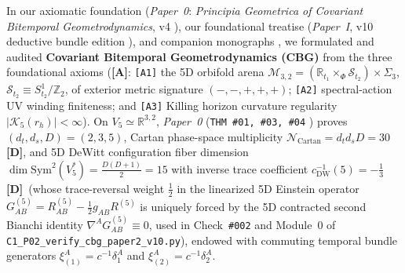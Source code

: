 \documentclass[11pt,a4paper]{article}
\newcommand{\catA}{\textbf{\textcolor{purple!80!black}{[A]}}}
\newcommand{\catD}{\textbf{\textcolor{blue!75!black}{[D]}}}
\theoremstyle{plain}
\theoremstyle{definition}
\theoremstyle{remark}
\numberwithin{equation}{section}
\begin{document}
In our axiomatic foundation (\textit{Paper~0}: \textit{Principia Geometrica of Covariant Bitemporal Geometrodynamics}, v4 \cite{jimenez2026_p0}), our foundational treatise (\textit{Paper~I}, v10 deductive bundle edition \cite{jimenez2026a}), and companion monographs \cite{JV_CycleII,JV_CycleIII,JV_PaperIV}, we formulated and audited \textbf{Covariant Bitemporal Geometrodynamics (CBG)} from the three foundational axioms (\catA: \texttt{[A1]} the 5D orbifold arena $\mathcal{M}_{3,2} = (\mathbb{R}_{t_1} \times_{\Phi} \mathcal{S}_{t_2}) \times \Sigma_3$, $\mathcal{S}_{t_2} \equiv S^1_{t_2}/\mathbb{Z}_2$, of exterior metric signature $(-,-,+,+,+)$; \texttt{[A2]} spectral-action UV winding finiteness; and \texttt{[A3]} Killing horizon curvature regularity $|\mathcal{K}_5(r_h)| < \infty$). On $V_5 \simeq \mathbb{R}^{3,2}$, \textit{Paper~0} (\texttt{THM~\#01, \#03, \#04} \cite{jimenez2026_p0}) proves $(d_t, d_s, D) = (2, 3, 5)$, Cartan phase-space multiplicity $\mathcal{N}_{\text{Cartan}} = d_t d_s D = 30$ \catD, and 5D DeWitt configuration fiber dimension $\dim\mathrm{Sym}^2(V_5^*) = \frac{D(D+1)}{2} = 15$ with inverse trace coefficient $c_{\text{DW}}^{-1}(5) = -\frac{1}{3}$ \catD\ (whose trace-reversal weight $\frac{1}{2}$ in the linearized 5D Einstein operator $G^{(5)}_{AB} = R^{(5)}_{AB} - \frac{1}{2}g_{AB}R^{(5)}$ is uniquely forced by the 5D contracted second Bianchi identity $\nabla^A G^{(5)}_{AB} \equiv 0$, used in Check~\texttt{\#002} and Module~0 of \allowbreak\texttt{C1\_P02\_verify\_cbg\_paper2\_v10.py}), endowed with commuting temporal bundle generators $\xi_{(1)}^A = c^{-1}\delta^A_1$ and $\xi_{(2)}^A = c^{-1}\delta^A_2$.
\end{document}
